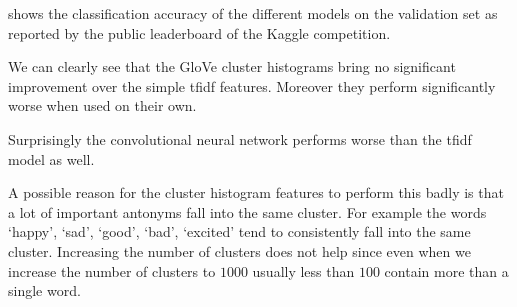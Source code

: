  shows the classification accuracy of the different models on the
validation set as reported by the public leaderboard of the Kaggle competition.

We can clearly see that the GloVe cluster histograms bring no significant
improvement over the simple tfidf features. Moreover they perform significantly
worse when used on their own.

Surprisingly the convolutional neural network performs worse than the tfidf model
as well.

A possible reason for the cluster histogram features to perform this badly is that
a lot of important antonyms fall into the same cluster. For example the words
`happy', `sad', `good', `bad', `excited' tend to consistently fall into the
same cluster. Increasing the number of clusters does not help since even when
we increase the number of clusters to $1000$ usually less than $100$ contain
more than a single word.
